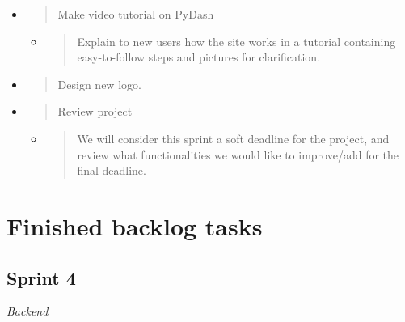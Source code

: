 \begin{itemize}
\item
  \begin{quote}
  Make video tutorial on PyDash
  \end{quote}

  \begin{itemize}
  \item
    \begin{quote}
    Explain to new users how the site works in a tutorial containing
    easy-to-follow steps and pictures for clarification.
    \end{quote}
  \end{itemize}
\item
  \begin{quote}
  Design new logo.
  \end{quote}
\item
  \begin{quote}
  Review project
  \end{quote}

  \begin{itemize}
  \item
    \begin{quote}
    We will consider this sprint a soft deadline for the project, and
    review what functionalities we would like to improve/add for the
    final deadline.
    \end{quote}
  \end{itemize}
\end{itemize}

\hypertarget{finished-backlog-tasks}{%
\section{Finished backlog tasks}\label{finished-backlog-tasks}}

\hypertarget{sprint-4}{%
\subsection{Sprint 4}\label{sprint-4}}

\emph{Backend}

